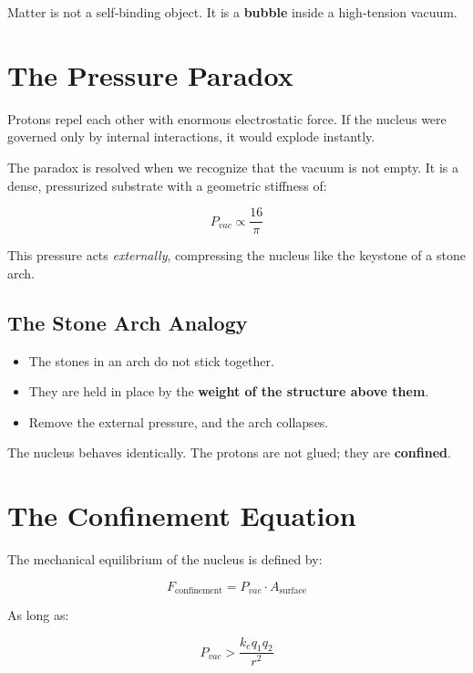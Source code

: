 \documentclass[11pt, letterpaper, openany]{book}
\begin{document}
Matter is not a self‑binding object.  
It is a \textbf{bubble} inside a high‑tension vacuum.

\section{The Pressure Paradox}

Protons repel each other with enormous electrostatic force.  
If the nucleus were governed only by internal interactions, it would explode instantly.

The paradox is resolved when we recognize that the vacuum is not empty.  
It is a dense, pressurized substrate with a geometric stiffness of:



\[
P_{vac} \propto \frac{16}{\pi}
\]



This pressure acts \textit{externally}, compressing the nucleus like the keystone of a stone arch.

\subsection{The Stone Arch Analogy}

\begin{itemize}
    \item The stones in an arch do not stick together.
    \item They are held in place by the \textbf{weight of the structure above them}.
    \item Remove the external pressure, and the arch collapses.
\end{itemize}

The nucleus behaves identically.  
The protons are not glued; they are \textbf{confined}.

\section{The Confinement Equation}

The mechanical equilibrium of the nucleus is defined by:



\[
F_{\text{confinement}} = P_{vac} \cdot A_{\text{surface}}
\]



As long as:



\[
P_{vac} > \frac{k_e q_1 q_2}{r^2}
\]
\end{document}
